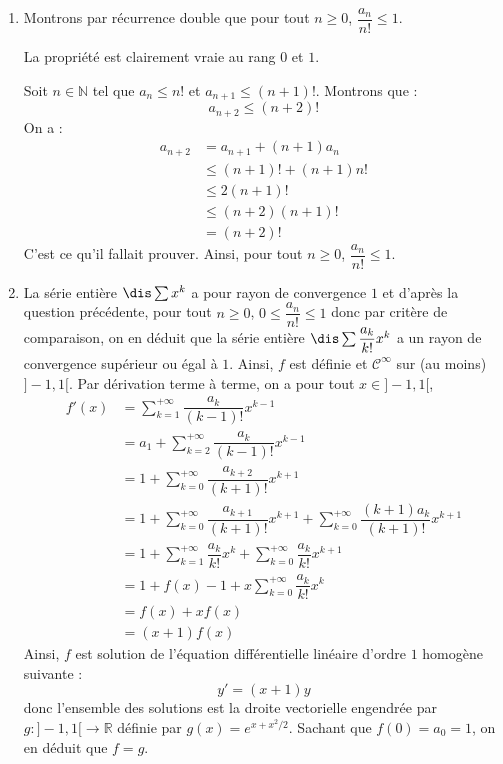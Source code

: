 \documentclass[a4paper,10pt]{report}
\begin{document}
\corr \begin{enumerate}
\item Montrons par récurrence double que pour tout $n \geq 0$, $\dfrac{a_n}{n!} \leq 1$.

\medskip

\noindent La propriété est clairement vraie au rang $0$ et $1$.

\medskip

\noindent Soit $n \in \mathbb{N}$ tel que $a_n \leq n!$ et $a_{n+1} \leq (n+1)!$. Montrons que :
$$ a_{n+2} \leq (n+2)!$$
On a :
\begin{align*}
a_{n+2} & = a_{n+1} + (n+1)a_n \\
& \leq (n+1)! + (n+1) n! \\
& \leq 2(n+1)! \\
& \leq (n+2)(n+1)! \\
& = (n+2)!
\end{align*}
C'est ce qu'il fallait prouver. Ainsi, pour tout $n \geq 0$, $\dfrac{a_n}{n!} \leq 1$.
\item La série entière $\dis \sum x^k $ a pour rayon de convergence $1$ et d'après la question précédente, pour tout $n \geq 0$, $0 \leq \dfrac{a_n}{n!} \leq 1$ donc par critère de comparaison, on en déduit que la série entière $\dis \sum \dfrac{a_k}{k!}x^k$ a un rayon de convergence supérieur ou égal à $1$. Ainsi, $f$ est définie et $\mathcal{C}^{\infty}$ sur (au moins) $]-1,1[$. Par dérivation terme à terme, on a pour tout $x \in ]-1,1[$,
\begin{align*}
f'(x) & = \sum_{k=1}^{+ \infty} \dfrac{a_k}{(k-1)!} x^{k-1} \\
& = a_1 + \sum_{k=2}^{+ \infty} \dfrac{a_k}{(k-1)!} x^{k-1} \\
& = 1 + \sum_{k=0}^{+ \infty} \dfrac{a_{k+2}}{(k+1)!} x^{k+1} \\
& = 1+ \sum_{k=0}^{+ \infty} \dfrac{a_{k+1}}{(k+1)!} x^{k+1}  + \sum_{k=0}^{+ \infty} \dfrac{(k+1)a_{k}}{(k+1)!} x^{k+1} \\
& = 1+ \sum_{k=1}^{+ \infty} \dfrac{a_{k}}{k!} x^{k} +  \sum_{k=0}^{+ \infty} \dfrac{a_{k}}{k!} x^{k+1} \\
& = 1+ f(x)-1  + x \sum_{k=0}^{+ \infty} \dfrac{a_{k}}{k!} x^{k} \\
& = f(x)+xf(x) \\
& = (x+1)f(x)
\end{align*} 
Ainsi, $f$ est solution de l'équation différentielle linéaire d'ordre $1$ homogène suivante :
$$ y'=(x+1)y$$
donc l'ensemble des solutions est la droite vectorielle engendrée par $g : ]-1,1[ \rightarrow \mathbb{R}$ définie par $g(x)=e^{x+x^2/2}$. Sachant que $f(0)=a_0=1$, on en déduit que $f=g$.

\end{enumerate}
\end{document}
